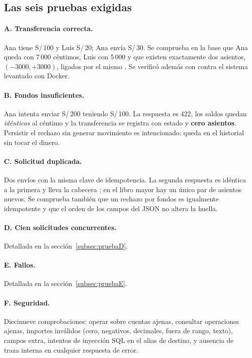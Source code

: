 \subsection{Las seis pruebas exigidas}

\paragraph{A. Transferencia correcta.} Ana tiene S/\,100 y Luis S/\,20; Ana
envía S/\,30. Se comprueba en la base que Ana queda con 7\,000 céntimos, Luis
con 5\,000 y que existen exactamente dos asientos, $(-3000, +3000)$, ligados
por el mismo . Se verificó además con 
contra el sistema levantado con Docker. 

\paragraph{B. Fondos insuficientes.} Ana intenta enviar S/\,200 teniendo
S/\,100. La respuesta es 422, los saldos quedan \emph{idénticos} al céntimo y
la transferencia se registra con estado  y \textbf{cero
asientos}. Persistir el rechazo sin generar movimiento es intencionado: queda
en el historial sin tocar el dinero. 

\paragraph{C. Solicitud duplicada.} Dos envíos con la misma clave de
idempotencia. La segunda respuesta es idéntica a la primera y lleva la
cabecera ; en el libro mayor hay un único par
de asientos nuevos. Se comprueba también que un rechazo por fondos es
igualmente idempotente y que el orden de los campos del JSON no altera la
huella. 

\paragraph{D. Cien solicitudes concurrentes.} Detallada en la
sección~\ref{subsec:pruebaD}.

\paragraph{E. Fallos.} Detallada en la sección~\ref{subsec:pruebaE}.

\paragraph{F. Seguridad.} Diecinueve comprobaciones: operar sobre cuentas
ajenas, consultar operaciones ajenas, importes inválidos (cero, negativos,
decimales, fuera de rango, texto), campos extra, intentos de inyección SQL en
el alias de destino, y ausencia de traza interna en cualquier respuesta de
error. 

